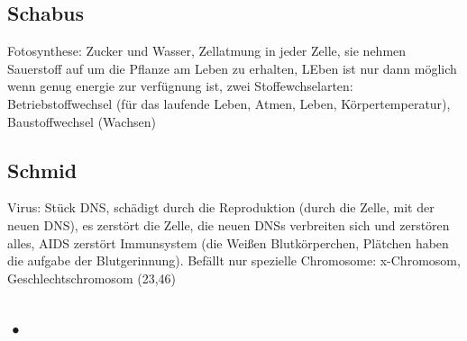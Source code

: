 \documentclass[a4paper]{article}
\begin{document}
\subsection{Schabus}

Fotosynthese: Zucker und Wasser, Zellatmung in jeder Zelle, sie nehmen Sauerstoff auf um die Pflanze am Leben zu erhalten, LEben ist nur dann möglich wenn genug energie zur verfügnung ist, zwei Stoffewchselarten: Betriebstoffwechsel (für das laufende Leben, Atmen, Leben, Körpertemperatur), Baustoffwechsel (Wachsen)

\subsection{Schmid}

Virus: Stück DNS, schädigt durch die Reproduktion (durch die Zelle, mit der neuen DNS), es zerstört die Zelle, die neuen DNSs verbreiten sich und zerstören alles, AIDS zerstört Immunsystem (die Weißen Blutkörperchen, Plätchen haben die aufgabe der Blutgerinnung). Befällt nur spezielle Chromosome: x-Chromosom, Geschlechtschromosom (23,46)

\subsection{•}
\end{document}
